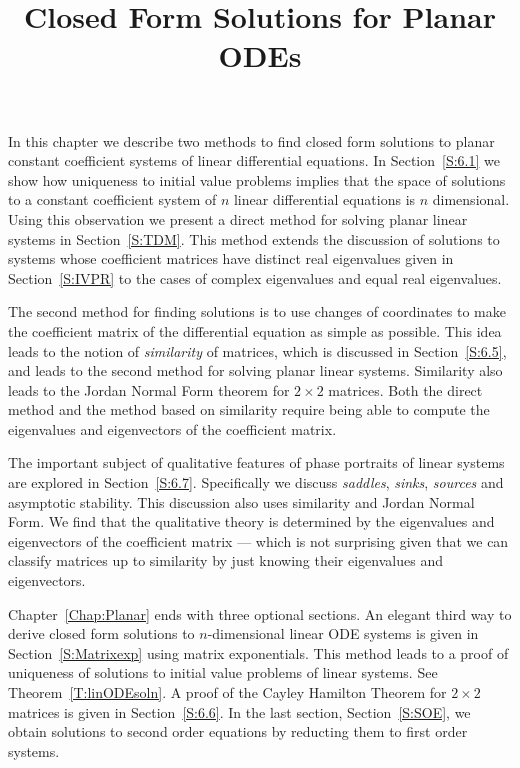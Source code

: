 \documentclass{ximera}
\title{Closed Form Solutions for Planar ODEs}
\begin{document}
\begin{abstract}
\end{abstract}
\maketitle


\label{Chap:Planar}

\normalsize

In this chapter we describe two methods to find closed form
solutions to planar constant coefficient systems of linear differential
equations.  In Section~\ref{S:6.1} we show how uniqueness to
initial value problems implies that the space of solutions to a constant
coefficient system of $n$ linear differential equations is $n$ dimensional.
Using this observation we present a direct method for solving planar linear
systems in Section~\ref{S:TDM}.  This method extends the discussion of
solutions to systems whose coefficient matrices have distinct real
eigenvalues given in Section~\ref{S:IVPR} to the cases of complex
eigenvalues and equal real eigenvalues.

The second method for finding solutions is to use changes of coordinates to 
make the coefficient matrix of the differential equation as simple as possible.  
This idea leads to the notion of {\em similarity\/} of matrices, which is discussed 
in Section~\ref{S:6.5}, and leads to the second method for solving planar linear 
systems. Similarity also leads to the Jordan Normal Form theorem for 
$2\times 2$ matrices.
Both the direct method and the method based on similarity require 
being able to compute the eigenvalues and eigenvectors of the coefficient matrix.

The important subject of qualitative features of phase portraits of linear systems are explored in
Section~\ref{S:6.7}.  Specifically we discuss {\em saddles\/}, {\em sinks\/}, 
{\em sources\/} and asymptotic stability.  This discussion also uses similarity 
and Jordan Normal Form.  We find that the qualitative theory is determined 
by the eigenvalues and eigenvectors of the coefficient matrix --- which is not 
surprising given that we can classify matrices up to similarity by just knowing 
their eigenvalues and eigenvectors.  

Chapter~\ref{Chap:Planar} ends with three optional sections.  An elegant third 
way to derive closed form solutions to $n$-dimensional linear ODE systems is
given in Section~\ref{S:Matrixexp} using matrix exponentials.  This method 
leads to a proof of uniqueness of solutions to initial value problems of linear systems.  
See Theorem~\ref{T:linODEsoln}.  A proof of the Cayley Hamilton Theorem 
for $2\times 2$ matrices is given in Section~\ref{S:6.6}.
In the last section, Section~\ref{S:SOE}, we obtain solutions to second order 
equations by reducting them to first order systems.
\end{document}
